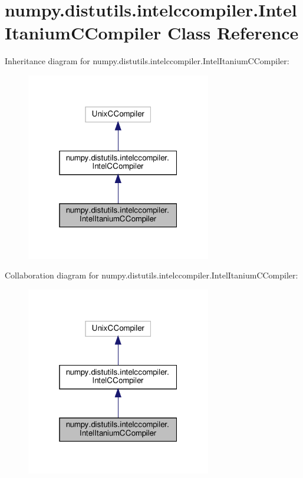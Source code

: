 \hypertarget{classnumpy_1_1distutils_1_1intelccompiler_1_1IntelItaniumCCompiler}{}\section{numpy.\+distutils.\+intelccompiler.\+Intel\+Itanium\+C\+Compiler Class Reference}
\label{classnumpy_1_1distutils_1_1intelccompiler_1_1IntelItaniumCCompiler}


Inheritance diagram for numpy.\+distutils.\+intelccompiler.\+Intel\+Itanium\+C\+Compiler\+:
\nopagebreak
\begin{figure}[H]
\begin{center}
\leavevmode
\includegraphics[width=229pt]{classnumpy_1_1distutils_1_1intelccompiler_1_1IntelItaniumCCompiler__inherit__graph}
\end{center}
\end{figure}


Collaboration diagram for numpy.\+distutils.\+intelccompiler.\+Intel\+Itanium\+C\+Compiler\+:
\nopagebreak
\begin{figure}[H]
\begin{center}
\leavevmode
\includegraphics[width=229pt]{classnumpy_1_1distutils_1_1intelccompiler_1_1IntelItaniumCCompiler__coll__graph}
\end{center}
\end{figure}
